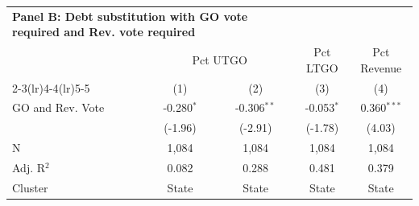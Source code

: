\begingroup
\centering
\begin{tabular*}{\textwidth}{@{\extracolsep{\fill}}lcccc}
\multicolumn{3}{l}{\textbf{Panel B: Debt substitution with GO vote required and Rev. vote required}}\\

\addlinespace
   \toprule
    & \multicolumn{2}{c}{Pct UTGO} & Pct LTGO & Pct Revenue\\
   \cmidrule(lr){2-3}\cmidrule(lr){4-4}\cmidrule(lr){5-5}
                    & (1)          & (2)           & (3)          & (4)\\  
   \midrule 
   GO and Rev. Vote & -0.280$^{*}$ & -0.306$^{**}$ & -0.053$^{*}$ & 0.360$^{***}$\\   
                    & (-1.96)     & (-2.91)      & (-1.78)     & (4.03)\\   
   \hline
   N     & 1,084        & 1,084         & 1,084        & 1,084\\  
   Adj. R$^2$   & 0.082        & 0.288         & 0.481        & 0.379\\  
   Cluster              & State & State & State & State\\  
   \bottomrule
\end{tabular*}
\par\endgroup
